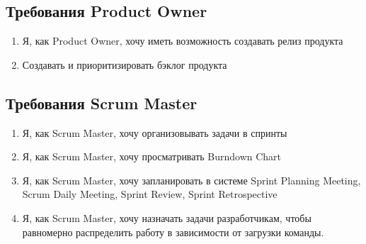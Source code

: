 \documentclass{article}
\begin{document}
\subsection{Требования Product Owner}
\begin{enumerate}[label=\textbf{POR\arabic*}.]
  \item Я, как Product Owner, хочу иметь возможность создавать релиз продукта
  \item Создавать и приоритизировать бэклог продукта
\end{enumerate}

\subsection{Требования Scrum Master}
\begin{enumerate}[label=\textbf{SMR\arabic*}.]
  \item Я, как Scrum Master, хочу организовывать задачи в спринты
  \item Я, как Scrum Master, хочу просматривать Burndown Chart
  \item Я, как Scrum Master, хочу запланировать в системе
    Sprint Planning Meeting, Scrum Daily Meeting, Sprint Review, Sprint Retrospective
  \item Я, как Scrum Master, хочу назначать задачи разработчикам, чтобы равномерно распределить работу в зависимости от загрузки команды.
\end{enumerate}

\printnoidxglossaries
\end{document}
